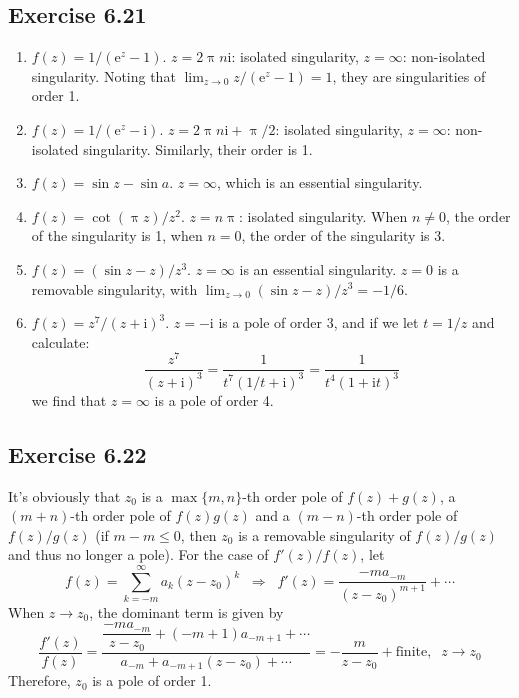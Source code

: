 \documentclass[]{ctexart}
\begin{document}
	\subsection{Exercise 6.21}
	\begin{enumerate}
		\item $f(z)=1/(\mathrm{e}^z-1)$. $z=2\uppi n\mathrm{i}$: isolated singularity, $z=\infty$: non-isolated singularity. Noting that $\lim_{z\to 0} z/(\mathrm{e}^z-1)=1$, they are singularities of order 1. 
		\item $f(z)=1/(\mathrm{e}^z-\mathrm{i})$. $z=2\uppi n\mathrm{i}+\uppi/2$: isolated singularity, $z=\infty$: non-isolated singularity. Similarly, their order is 1. 
		\item $f(z)=\sin z-\sin a$. $z=\infty$, which is an essential singularity. 
		\item $f(z)=\cot (\uppi z)/z^2$. $z=n\uppi$: isolated singularity. When $n\ne 0$, the order of the singularity is 1, when $n=0$, the order of the singularity is 3. 
		\item $f(z)=(\sin z-z)/z^3$. $z=\infty$ is an essential singularity. $z=0$ is a removable singularity, with $\lim_{z\to 0}(\sin z-z)/z^3=-1/6$. 
		\item $f(z)=z^7/(z+\mathrm{i})^3$. $z=-\mathrm{i}$ is a pole of order 3, and if we let $t=1/z$ and calculate: 
		\begin{equation*}
		\frac{z^7}{(z+\mathrm{i})^3}=\frac{1}{t^7(1/t+\mathrm{i})^3}=\frac{1}{t^4(1+\mathrm{i}t)^3}
		\end{equation*}
		we find that $z=\infty$ is a pole of order 4.  
	\end{enumerate}
	\subsection{Exercise 6.22}
	It's obviously that $z_0$ is a $\max\{m,n\}$-th order pole of $f(z)+g(z)$, a $(m+n)$-th order pole of $f(z)g(z)$ and a $(m-n)$-th order pole of $f(z)/g(z)$ (if $m-m\le 0$, 
	then $z_0$ is a removable singularity of $f(z)/g(z)$ and thus no longer a pole). For the case of $f'(z)/f(z)$, let 
	\begin{equation*}
	f(z)=\sum_{k=-m}^\infty a_k(z-z_0)^k\;\;\Rightarrow\;\;f'(z)=\frac{-ma_{-m}}{(z-z_0)^{m+1}}+\cdots
	\end{equation*}
	When $z\to z_0$, the dominant term is given by 
	\begin{equation*}
	\frac{f'(z)}{f(z)}=\frac{\dfrac{-ma_{-m}}{z-z_0}+(-m+1)a_{-m+1}+\cdots}{a_{-m}+a_{-m+1}(z-z_0)+\cdots}=-\frac{m}{z-z_0}+\text{finite},\;\;z\to z_0
	\end{equation*}
	Therefore, $z_0$ is a pole of order 1. 
\end{document}
